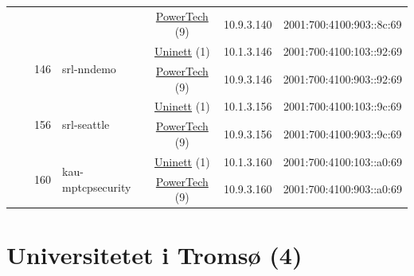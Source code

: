 \begin{small}
\begin{center}
\begin{longtable}{|c|c|c|c|c|c|c|c|}
  &  &  &  & \multicolumn{2}{|c|}{\tiny{\href{http://www.powertech.no}{PowerTech} (9)}} & \tiny{10.9.3.140} & \tiny{2001:700:4100:903::8c:69} \\* \cline{3-3}\cline{4-4}\cline{5-5}\cline{6-6}\cline{7-7}\cline{8-8}
  &  & \multirow{2}{*}{\tiny{146}} & \multicolumn{1}{|l|}{\multirow{2}{*}{\tiny{srl-nndemo}}} & \multicolumn{2}{|c|}{\tiny{\href{https://www.uninett.no}{Uninett} (1)}} & \tiny{10.1.3.146} & \tiny{2001:700:4100:103::92:69} \\* \cline{5-5}\cline{6-6}\cline{7-7}\cline{8-8}
  &  &  &  & \multicolumn{2}{|c|}{\tiny{\href{http://www.powertech.no}{PowerTech} (9)}} & \tiny{10.9.3.146} & \tiny{2001:700:4100:903::92:69} \\* \cline{3-3}\cline{4-4}\cline{5-5}\cline{6-6}\cline{7-7}\cline{8-8}
  &  & \multirow{2}{*}{\tiny{156}} & \multicolumn{1}{|l|}{\multirow{2}{*}{\tiny{srl-seattle}}} & \multicolumn{2}{|c|}{\tiny{\href{https://www.uninett.no}{Uninett} (1)}} & \tiny{10.1.3.156} & \tiny{2001:700:4100:103::9c:69} \\* \cline{5-5}\cline{6-6}\cline{7-7}\cline{8-8}
  &  &  &  & \multicolumn{2}{|c|}{\tiny{\href{http://www.powertech.no}{PowerTech} (9)}} & \tiny{10.9.3.156} & \tiny{2001:700:4100:903::9c:69} \\* \cline{3-3}\cline{4-4}\cline{5-5}\cline{6-6}\cline{7-7}\cline{8-8}
  &  & \multirow{2}{*}{\tiny{160}} & \multicolumn{1}{|l|}{\multirow{2}{*}{\tiny{kau-mptcpsecurity}}} & \multicolumn{2}{|c|}{\tiny{\href{https://www.uninett.no}{Uninett} (1)}} & \tiny{10.1.3.160} & \tiny{2001:700:4100:103::a0:69} \\* \cline{5-5}\cline{6-6}\cline{7-7}\cline{8-8}
  &  &  &  & \multicolumn{2}{|c|}{\tiny{\href{http://www.powertech.no}{PowerTech} (9)}} & \tiny{10.9.3.160} & \tiny{2001:700:4100:903::a0:69} \\ \hline
\end{longtable}
\end{center}
\end{small}



\section{Universitetet i Tromsø (4)}
\label{sec:UiT}

